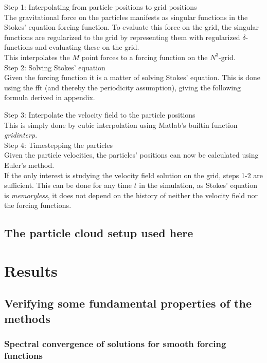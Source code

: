 \documentclass[a4paper,twoside=false,abstract=false,numbers=noenddot,
titlepage=false,headings=small,parskip=half,version=last]{scrartcl}
\begin{document}
Step 1: Interpolating from particle positions to grid positions\\
The gravitational force on the particles manifests as singular functions in the Stokes' equation forcing function. To evaluate this force on the grid, the singular functions are regularized to the grid by representing them with regularized $\delta$-functions and evaluating these on the grid.\\ This interpolates the $M$ point forces to a forcing function on the $N^3$-grid.\\
Step 2: Solving Stokes' equation\\
Given the forcing function it is a matter of solving Stokes' equation. This is done using the fft (and thereby the periodicity assumption), giving the following formula derived in appendix.

Step 3: Interpolate the velocity field to the particle positions\\
This is simply done by cubic interpolation using Matlab's builtin function \emph{gridinterp}.\\
Step 4: Timestepping the particles\\
Given the particle velocities, the particles' positions can now be calculated using Euler's method.\\

If the only interest is studying the velocity field solution on the grid, steps 1-2 are sufficient. This can be done for any time $t$ in the simulation, as Stokes' equation is \emph{memoryless}, it does not depend on the history of neither the velocity field nor the forcing functions.

\subsection{The particle cloud setup used here}

\section{Results}

\subsection{Verifying some fundamental properties of the methods}
\subsubsection{Spectral convergence of solutions for smooth forcing functions}
\end{document}
